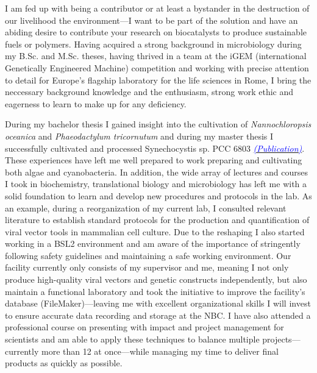 \documentclass[11pt,a4paper,sans]{moderncv}
\begin{document}

       
\makelettertitle
\begin{spacing}{1.15}

I am fed up with being a contributor or at least a bystander in the destruction of our livelihood the environment---I want to be part of the solution and have an abiding desire to contribute your research on biocatalysts to produce sustainable fuels or polymers.
Having acquired a strong background in microbiology during my B.Sc. and M.Sc. theses, having thrived in a team at the iGEM (international Genetically Engineered Machine) competition and working with precise attention to detail for Europe's flagship laboratory for the life sciences in Rome, I bring the neccessary background knowledge and the enthusiasm, strong work ethic and eagerness to learn to make up for any deficiency. 
\par\vspace*{1mm} %

During my bachelor thesis I gained insight into the cultivation of \textit{Nannochloropsis oceanica} and \textit{Phaeodactylum tricornutum} and during my master thesis I successfully cultivated and processed Synechocystis sp. PCC 6803 {\href{https://www.ncbi.nlm.nih.gov/pubmed/29517395}{\textcolor{blue}{{\textit{(Publication)}}}}}. %
These experiences have left me well prepared to work preparing and cultivating both algae and cyanobacteria. %
In addition, the wide array of lectures and courses I took in biochemistry, translational biology and microbiology has  left me with a solid foundation to learn and develop new procedures and protocols in the lab. 
As an example, during a reorganization of my current lab, I consulted relevant literature to establish standard protocols for the production and quantification of viral vector tools in mammalian cell culture. 
Due to the reshaping I also started working in a BSL2 environment and am aware of the importance of stringently following safety guidelines and maintaining a safe working environment. 
Our facility currently only consists of my supervisor and me, meaning I not only produce high-quality viral vectors and genetic constructs independently, but also maintain a functional laboratory and took the initiative to improve the facility's database (FileMaker)---leaving me with excellent organizational skills I will invest to ensure accurate data recording and storage at the NBC.  
I have also attended a professional course on presenting with impact and project management for scientists and am able to apply these techniques to balance multiple projects---currently more than 12 at once---while managing my time to deliver final products as quickly as possible.


\end{spacing}
\end{document}
